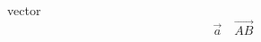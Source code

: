 \documentclass{article}
\begin{document}
vector
\begin{displaymath}
\vec a\quad\overrightarrow{AB}
\end{displaymath}
\end{document}

